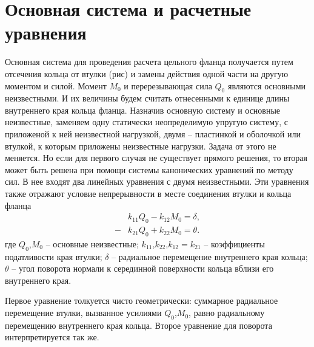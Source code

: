 \section{Основная система и расчетные уравнения}
\label{GeneralSystem}

Основная система для проведения расчета цельного фланца получается путем отсечения кольца от втулки (рис) и замены действия одной части на другую моментом и силой. 
Момент $M_0$ и перерезывающая сила $Q_0$ являются основными неизвестными. 
И их величины будем считать отнесенными к единице длины внутреннего края кольца фланца.
Назначив основную систему и основные неизвестные, заменяем одну статически неопределимую упругую систему, с приложеной к ней неизвестной нагрузкой, двумя -- пластинкой и оболочкой или втулкой, к которым приложены неизвестные нагрузки. 
Задача от этого не меняется.
Но если для первого случая не существует прямого решения, то вторая может быть решена при помощи системы канонических уравнений по методу сил.
В нее входят два линейных уравнения с двумя неизвестными.
Эти уравнения также отражают условие непрерывности в месте соединения втулки и кольца фланца
\begin{equation}
  \begin{split}
    &k_{11}Q_0-k_{12}M_0= \delta,\\
    -&k_{21}Q_0+k_{22}M_0= \theta.
  \end{split}
  \label{GeneralSystem_eq1}
\end{equation}
где 
$Q_0$,$M_0$ -- основные неизвестные;
$k_{11}$,$k_{22}$,$k_{12}=k_{21}$ -- коэффициенты податливости края втулки;
$\delta$ -- радиальное перемещение внутреннего края кольца;
$\theta$ -- угол поворота нормали к серединной поверхности кольца вблизи его внутреннего края. 

Первое уравнение толкуется чисто геометрически: суммарное радиальное перемещение втулки, вызванное усилиями $Q_0$,$M_0$, равно радиальному перемещению внутреннего края кольца. 
Второе уравнение для поворота интерпретируется так же. 

